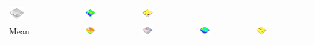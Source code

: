 \documentclass[prodmode,acmtochi]{acmsmall} %
\begin{document}
\begin{table}
{\begin{tabular}{m{} m{} m{} m{} m{}}
\includegraphics[width=0.22\textwidth]{images/render_3d/participants/dem_difference_4.png} &
\includegraphics[width=0.22\textwidth]{images/render_3d/participants/slope_4.png} &
\includegraphics[width=0.22\textwidth]{images/render_3d/participants/forms_4.png}\\
%
Mean & 
\includegraphics[width=0.22\textwidth]{images/render_3d/participants/mean_dem_4.png} &
\includegraphics[width=0.22\textwidth]{images/render_3d/participants/mean_dem_difference_4.png} &
\includegraphics[width=0.22\textwidth]{images/render_3d/participants/mean_slope_4.png} &
\includegraphics[width=0.22\textwidth]{images/render_3d/participants/mean_forms_4.png}\\

\end{tabular}}
\end{table}
\end{document}
